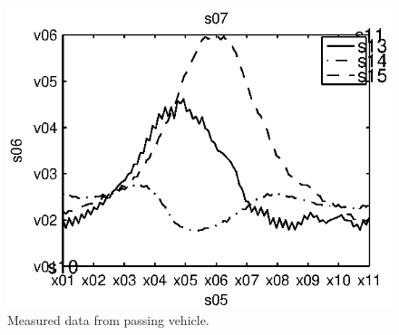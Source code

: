 \begin{subfigures}
\begin{figure}[!htb]
\begin{minipage}{0.45\linewidth}
   \includegraphics[width=\linewidth]{images/est_data_three}
  \caption[Measured data from passing vehicle.]{Measured data from passing vehicle.\\}
  \label{fig-leastsqest}
  \end{minipage}
 \end{figure}


\end{subfigures}
